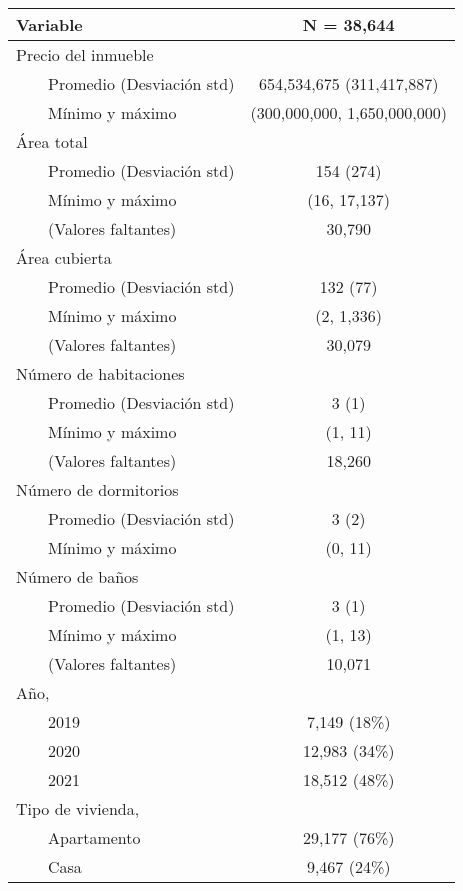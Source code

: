 \begin{longtable}{lc}
\toprule
\textbf{Variable} & \textbf{N = 38,644} \\ 
\midrule
Precio del inmueble &  \\ 
    Promedio (Desviación std) & 654,534,675 (311,417,887) \\ 
    Mínimo y máximo & (300,000,000, 1,650,000,000) \\ 
Área total &  \\ 
    Promedio (Desviación std) & 154 (274) \\ 
    Mínimo y máximo & (16, 17,137) \\ 
    (Valores faltantes) & 30,790 \\ 
Área cubierta &  \\ 
    Promedio (Desviación std) & 132 (77) \\ 
    Mínimo y máximo & (2, 1,336) \\ 
    (Valores faltantes) & 30,079 \\ 
Número de habitaciones &  \\ 
    Promedio (Desviación std) & 3 (1) \\ 
    Mínimo y máximo & (1, 11) \\ 
    (Valores faltantes) & 18,260 \\ 
Número de dormitorios &  \\ 
    Promedio (Desviación std) & 3 (2) \\ 
    Mínimo y máximo & (0, 11) \\ 
Número de baños &  \\ 
    Promedio (Desviación std) & 3 (1) \\ 
    Mínimo y máximo & (1, 13) \\ 
    (Valores faltantes) & 10,071 \\ 
Año,  &  \\ 
    2019 & 7,149  (18\%) \\ 
    2020 & 12,983  (34\%) \\ 
    2021 & 18,512  (48\%) \\ 
Tipo de vivienda,  &  \\ 
    Apartamento & 29,177  (76\%) \\ 
    Casa & 9,467  (24\%) \\ 
\bottomrule
\end{longtable}

